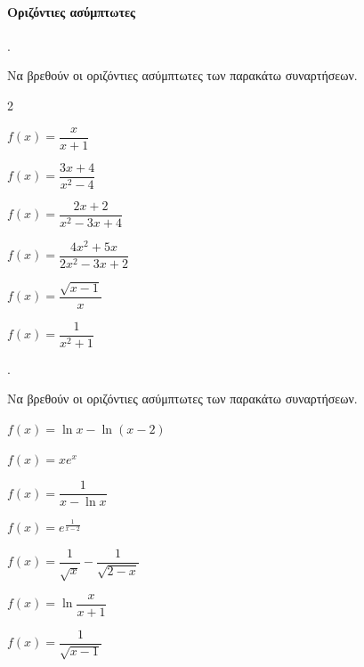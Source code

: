 \documentclass[11pt,a4paper,twocolumn]{article}
\newcounter{askhsh}
\newcommand{\askhsh}{\large\theaskhsh.\ \addtocounter{askhsh}{1}}
\begin{document}
\paragraph{Οριζόντιες ασύμπτωτες}
\askhsh Να βρεθούν οι οριζόντιες ασύμπτωτες των παρακάτω συναρτήσεων.
\begin{multicols}{2}
\begin{alist}[leftmargin=5mm]
\item $f(x)=\dfrac{x}{x+1}$
\item $f(x)=\dfrac{3x+4}{x^2-4}$
\item $f(x)=\dfrac{2x+2}{x^2-3x+4}$
\item $f(x)=\dfrac{4x^2+5x}{2x^2-3x+2}$
\item $f(x)=\dfrac{\sqrt{x-1}}{x}$
\item $f(x)=\dfrac{1}{x^2+1}$
\end{alist}
\end{multicols}
\askhsh Να βρεθούν οι οριζόντιες ασύμπτωτες των παρακάτω συναρτήσεων.
\begin{alist}
\item $f(x)=\ln{x}-\ln{(x-2)}$
\item $f(x)=xe^x$
\item $f(x)=\dfrac{1}{x-\ln{x}}$
\item $f(x)=e^{\frac{1}{x-2}}$
\item $f(x)=\dfrac{1}{\sqrt{x}}-\dfrac{1}{\sqrt{2-x}}$
\item $f(x)=\ln\dfrac{x}{x+1}$
\item $f(x)=\dfrac{1}{\sqrt{x-1}}$
\end{alist}
\end{document}
